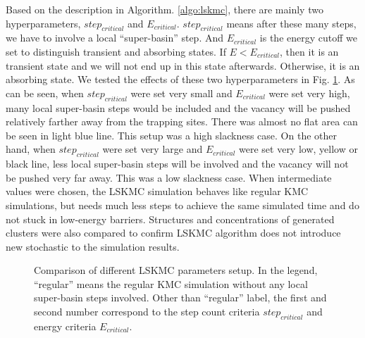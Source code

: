  
Based on the description in Algorithm. \ref{algo:lskmc}, there are mainly two hyperparameters, $step_{critical}$ and $E_{critical}$. $step_{critical}$ means after these many steps, we have to involve a local ``super-basin'' step. And $E_{critical}$ is the energy cutoff we set to distinguish transient and absorbing states. If $E < E_{critical}$, then it is an transient state and we will not end up in this state afterwards. Otherwise, it is an absorbing state. We tested the effects of these two hyperparameters in Fig. \ref{Chap:Al/Vac:fig:lskmc_time}. As can be seen, when $step_{critical}$ were set very small and $E_{critical}$ were set very high, many local super-basin steps would be included and the vacancy will be pushed relatively farther away from the trapping sites. There was almost no flat area can be seen in light blue line. This setup was a high slackness case. On the other hand, when $step_{critical}$ were set very large and $E_{critical}$ were set very low, yellow or black line, less local super-basin steps will be involved and the vacancy will not be pushed very far away. This was a low slackness case. When intermediate values were chosen, the \ac{LSKMC} simulation behaves like regular \ac{KMC} simulations, but needs much less steps to achieve the same simulated time and do not stuck in low-energy barriers.  Structures and concentrations of generated clusters were also compared to confirm \ac{LSKMC} algorithm does not introduce new stochastic to the simulation results.

\begingroup
\begin{figure}[!ht]
  \centering
\caption[Comparison of different \acf{LSKMC} parameters setup.]{Comparison of different \ac{LSKMC} parameters setup. In the legend, ``regular'' means the regular \ac{KMC} simulation without any local super-basin steps involved. Other than ``regular'' label, the first and second number correspond to the step count criteria $step_{critical}$ and energy criteria $E_{critical}$.}
\label{Chap:Al/Vac:fig:lskmc_time}
\end{figure}
\endgroup